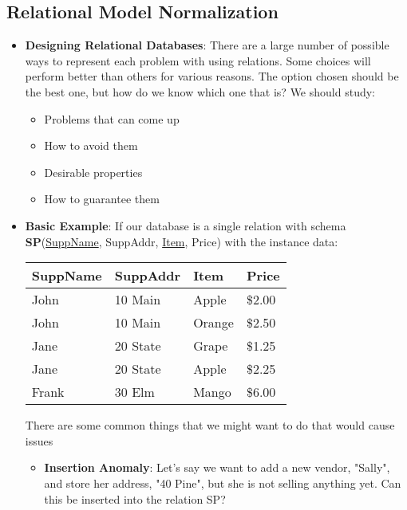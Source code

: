 \documentclass{report}
\begin{document}
    \pagebreak 
    \subsection{Relational Model Normalization}
    \begin{itemize}
        \item \textbf{Designing Relational Databases}: There are a large number of possible ways to represent each problem with using relations. Some choices will perform better than others for various reasons. The option chosen should be the best one, but how do we know which one that is?
            \bigbreak \noindent 
            We should study:
            \begin{itemize}
                \item Problems that can come up
                \item How to avoid them
                \item Desirable properties
                \item How to guarantee them
            \end{itemize}
        \item \textbf{Basic Example}: If our database is a single relation with schema \textbf{SP}(\underline{SuppName}, SuppAddr, \underline{Item}, Price) with the instance data:
            \bigbreak \noindent 
            \begin{center}
                \begin{tabular}{|l|l|l|l|}
                    \hline
                    \textbf{SuppName} & \textbf{SuppAddr} & \textbf{Item} & \textbf{Price} \\ \hline
                    John    & 10 Main   & Apple   & \$2.00  \\ \hline
                    John    & 10 Main   & Orange  & \$2.50  \\ \hline
                    Jane    & 20 State  & Grape   & \$1.25  \\ \hline
                    Jane    & 20 State  & Apple   & \$2.25  \\ \hline
                    Frank   & 30 Elm    & Mango   & \$6.00  \\ \hline
                \end{tabular}
            \end{center}
            \bigbreak \noindent 
            There are some common things that we might want to do that would cause issues
            \begin{itemize}
                \item \textbf{Insertion Anomaly}: Let's say we want to add a new vendor, "Sally", and store her address, "40 Pine", but she is not selling anything yet. Can this be inserted into the relation SP?

\end{itemize}
\end{itemize}
\end{document}
